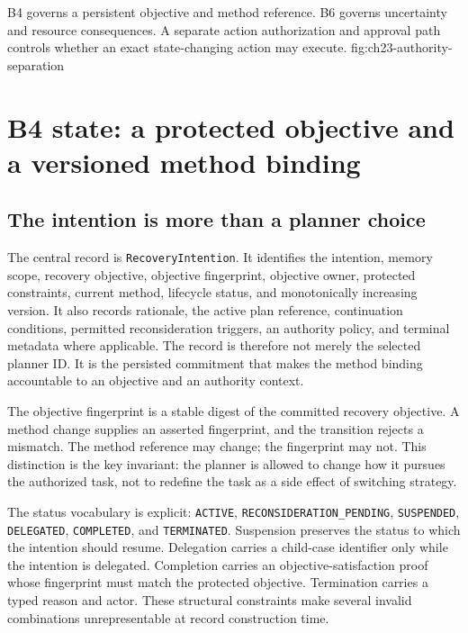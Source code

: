   {B4 governs a persistent objective and method reference. B6 governs uncertainty and resource consequences. A separate action authorization and approval path controls whether an exact state-changing action may execute.}
  {fig:ch23-authority-separation}

\section{B4 state: a protected objective and a versioned method binding}
\label{sec:ch23-b4-state}

\subsection{The intention is more than a planner choice}
\label{subsec:ch23-intention-record}

The central record is \texttt{RecoveryIntention}. It identifies the intention, memory scope, recovery objective, objective fingerprint, objective owner, protected constraints, current method, lifecycle status, and monotonically increasing version. It also records rationale, the active plan reference, continuation conditions, permitted reconsideration triggers, an authority policy, and terminal metadata where applicable. The record is therefore not merely the selected planner ID. It is the persisted commitment that makes the method binding accountable to an objective and an authority context.

The objective fingerprint is a stable digest of the committed recovery objective. A method change supplies an asserted fingerprint, and the transition rejects a mismatch. The method reference may change; the fingerprint may not. This distinction is the key invariant: the planner is allowed to change how it pursues the authorized task, not to redefine the task as a side effect of switching strategy.

The status vocabulary is explicit: \texttt{ACTIVE}, \texttt{RECONSIDERATION\_PENDING}, \texttt{SUSPENDED}, \texttt{DELEGATED}, \texttt{COMPLETED}, and \texttt{TERMINATED}. Suspension preserves the status to which the intention should resume. Delegation carries a child-case identifier only while the intention is delegated. Completion carries an objective-satisfaction proof whose fingerprint must match the protected objective. Termination carries a typed reason and actor. These structural constraints make several invalid combinations unrepresentable at record construction time.

